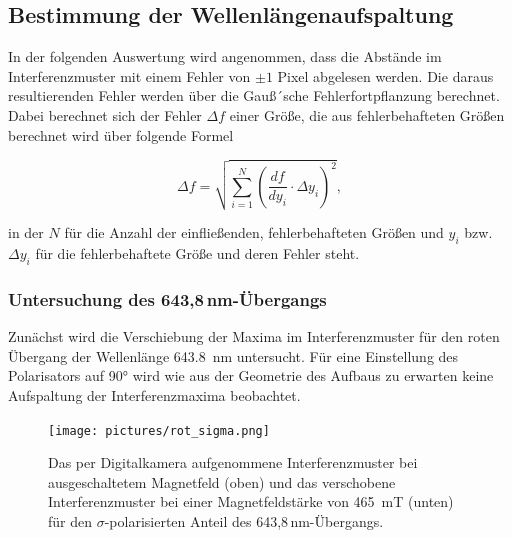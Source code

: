         \FloatBarrier

    \newpage
    \subsection{Bestimmung der Wellenlängenaufspaltung}
        In der folgenden Auswertung wird angenommen, dass die Abstände im Interferenzmuster mit einem Fehler von $\pm 1$ Pixel abgelesen werden. Die daraus resultierenden Fehler werden über die Gauß´sche
        Fehlerfortpflanzung berechnet. Dabei berechnet sich der Fehler $\Delta f$ einer Größe, die aus fehlerbehafteten Größen berechnet wird über folgende Formel
        
        \begin{equation*}
          \Delta f = \sqrt{\sum_{i=1}^N (\frac{df}{dy_i}\cdot \Delta y_i)^2},
        \end{equation*}

        in der $N$ für die Anzahl der einfließenden, fehlerbehafteten Größen und $y_i$ bzw. $\Delta y_i$ für die fehlerbehaftete Größe und deren Fehler steht.

        \subsubsection*{Untersuchung des 643,8\,nm-Übergangs}
            Zunächst wird die Verschiebung der Maxima im Interferenzmuster für den roten Übergang der Wellenlänge \SI{643.8}{\nano\metre} untersucht. Für eine Einstellung des Polarisators auf 90° wird wie aus
            der Geometrie des Aufbaus zu erwarten keine Aufspaltung der Interferenzmaxima beobachtet.

            \FloatBarrier

            \begin{figure}[h]
              \centering
              \texttt{[image: pictures/rot\_sigma.png]}
              \caption{Das per Digitalkamera aufgenommene Interferenzmuster bei ausgeschaltetem Magnetfeld (oben) und das verschobene Interferenzmuster bei einer Magnetfeldstärke von \SI{465}{\milli\tesla} (unten) für den $\sigma$-polarisierten Anteil des 643,8\,nm-Übergangs.}
              \label{fig:rot_sigma}
            \end{figure}
        
            \FloatBarrier

